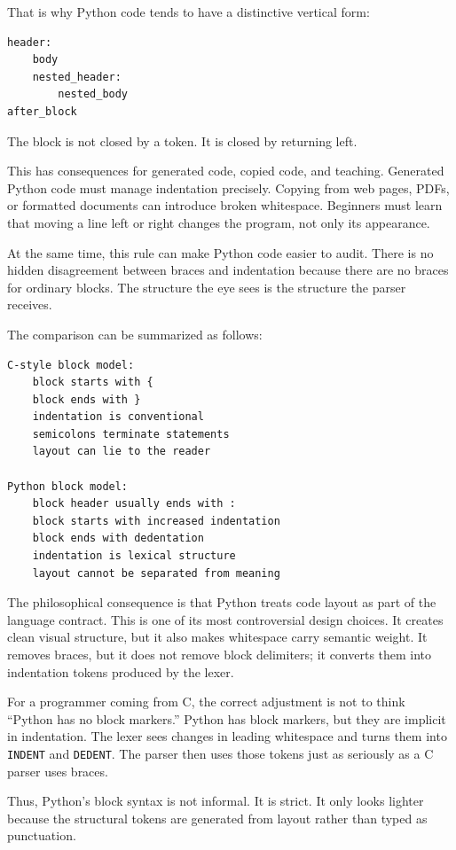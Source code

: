 That is why Python code tends to have a distinctive vertical form:

\begin{verbatim}
header:
    body
    nested_header:
        nested_body
after_block
\end{verbatim}

The block is not closed by a token. It is closed by returning left.

This has consequences for generated code, copied code, and teaching. Generated Python code must manage indentation precisely. Copying from web pages, PDFs, or formatted documents can introduce broken whitespace. Beginners must learn that moving a line left or right changes the program, not only its appearance.

At the same time, this rule can make Python code easier to audit. There is no hidden disagreement between braces and indentation because there are no braces for ordinary blocks. The structure the eye sees is the structure the parser receives.

The comparison can be summarized as follows:

\begin{verbatim}
C-style block model:
    block starts with {
    block ends with }
    indentation is conventional
    semicolons terminate statements
    layout can lie to the reader

Python block model:
    block header usually ends with :
    block starts with increased indentation
    block ends with dedentation
    indentation is lexical structure
    layout cannot be separated from meaning
\end{verbatim}

The philosophical consequence is that Python treats code layout as part of the language contract. This is one of its most controversial design choices. It creates clean visual structure, but it also makes whitespace carry semantic weight. It removes braces, but it does not remove block delimiters; it converts them into indentation tokens produced by the lexer.

For a programmer coming from C, the correct adjustment is not to think “Python has no block markers.” Python has block markers, but they are implicit in indentation. The lexer sees changes in leading whitespace and turns them into \texttt{INDENT} and \texttt{DEDENT}. The parser then uses those tokens just as seriously as a C parser uses braces.

Thus, Python's block syntax is not informal. It is strict. It only looks lighter because the structural tokens are generated from layout rather than typed as punctuation.